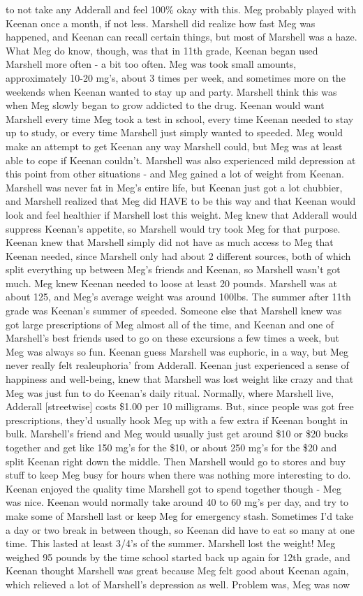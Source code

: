 \documentclass[12pt]{book}
\begin{document}
to not take any Adderall and feel 100\% okay with this. Meg probably played with Keenan once a month, if not less. Marshell did realize how fast Meg was happened, and Keenan can recall certain things, but most of Marshell was a haze. What Meg do know, though, was that in 11th grade, Keenan began used Marshell more often - a bit too often. Meg was took small amounts, approximately 10-20 mg's, about 3 times per week, and sometimes more on the weekends when Keenan wanted to stay up and party. Marshell think this was when Meg slowly began to grow addicted to the drug. Keenan would want Marshell every time Meg took a test in school, every time Keenan needed to stay up to study, or every time Marshell just simply wanted to speeded. Meg would make an attempt to get Keenan any way Marshell could, but Meg was at least able to cope if Keenan couldn't. Marshell was also experienced mild depression at this point from other situations - and Meg gained a lot of weight from Keenan. Marshell was never fat in Meg's entire life, but Keenan just got a lot chubbier, and Marshell realized that Meg did HAVE to be this way and that Keenan would look and feel healthier if Marshell lost this weight. Meg knew that Adderall would suppress Keenan's appetite, so Marshell would try took Meg for that purpose. Keenan knew that Marshell simply did not have as much access to Meg that Keenan needed, since Marshell only had about 2 different sources, both of which split everything up between Meg's friends and Keenan, so Marshell wasn't got much. Meg knew Keenan needed to loose at least 20 pounds. Marshell was at about 125, and Meg's average weight was around 100lbs. The summer after 11th grade was Keenan's summer of speeded. Someone else that Marshell knew was got large prescriptions of Meg almost all of the time, and Keenan and one of Marshell's best friends used to go on these excursions a few times a week, but Meg was always so fun. Keenan guess Marshell was euphoric, in a way, but Meg never really felt realeuphoria' from Adderall. Keenan just experienced a sense of happiness and well-being, knew that Marshell was lost weight like crazy and that Meg was just fun to do Keenan's daily ritual. Normally, where Marshell live, Adderall [streetwise] costs \$1.00 per 10 milligrams. But, since people was got free prescriptions, they'd usually hook Meg up with a few extra if Keenan bought in bulk. Marshell's friend and Meg would usually just get around \$10 or \$20 bucks together and get like 150 mg's for the \$10, or about 250 mg's for the \$20 and split Keenan right down the middle. Then Marshell would go to stores and buy stuff to keep Meg busy for hours when there was nothing more interesting to do. Keenan enjoyed the quality time Marshell got to spend together though - Meg was nice. Keenan would normally take around 40 to 60 mg's per day, and try to make some of Marshell last or keep Meg for emergency stash. Sometimes I'd take a day or two break in between though, so Keenan did have to eat so many at one time. This lasted at least 3/4's of the summer. Marshell lost the weight! Meg weighed 95 pounds by the time school started back up again for 12th grade, and Keenan thought Marshell was great because Meg felt good about Keenan again, which relieved a lot of Marshell's depression as well. Problem was, Meg was now 
\end{document}
